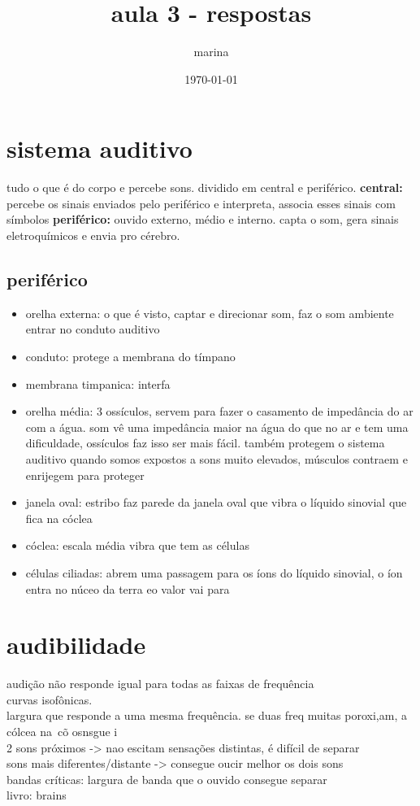 \documentclass{article}
\title{aula 3 - respostas}
\author{marina}
\date{\today}
\begin{document}
\maketitle
\section{sistema auditivo}
tudo o que é do corpo e percebe sons. dividido em central e periférico.
\textbf{central:} percebe os sinais enviados pelo periférico e interpreta, associa esses sinais com símbolos
\textbf{periférico:} ouvido externo, médio e interno. capta o som, gera sinais eletroquímicos e envia pro cérebro.
\subsection{periférico}
\begin{itemize}
    \item orelha externa: o que é visto, captar e direcionar som, faz o som ambiente entrar no conduto auditivo
    \item conduto: protege a membrana do tímpano
    \item membrana timpanica: interfa
    \item orelha média: 3 ossículos, servem para fazer o casamento de impedância do ar com a água. som vê uma impedância maior na água do que no ar e tem uma dificuldade, ossículos faz isso ser mais fácil. também protegem o sistema auditivo quando somos expostos a sons muito elevados, músculos contraem e enrijegem para proteger
    \item janela oval: estribo faz parede da janela oval que vibra o líquido sinovial que fica na cóclea
    \item cóclea: escala média vibra que tem as células
    \item células ciliadas: abrem uma passagem para os íons do líquido sinovial, o íon entra no núceo da terra  eo valor vai para
\end{itemize}
\section{audibilidade}
audição não responde igual para todas as faixas de frequência \\
curvas isofônicas.\\
largura que responde a uma mesma frequência. se duas freq muitas poroxi,am, a cólcea na~cõ osnsgue i\\
2 sons próximos -> nao escitam sensações distintas, é difícil de separar\\
sons mais diferentes/distante -> consegue oucir melhor os dois sons\\
bandas críticas: largura de banda que o ouvido consegue separar\\
livro: brains\\
\end{document}
